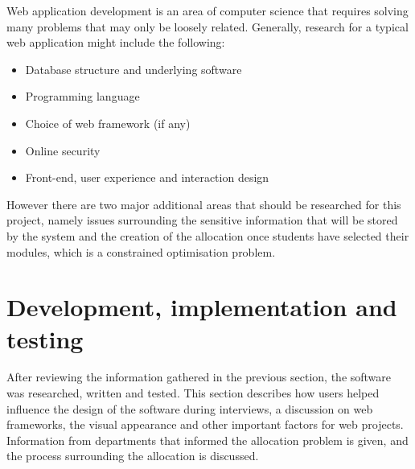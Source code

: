 \documentclass[twoside]{scrartcl}
\let\stdsection\section
\renewcommand\section{\clearpage\stdsection}
\begin{document}

Web application development is an area of computer science that requires
solving many problems that may only be loosely related. Generally, research
for a typical web application might include the following:

\begin{itemize}
  \item Database structure and underlying software
  \item Programming language
  \item Choice of web framework (if any)
  \item Online security
  \item Front-end, user experience and interaction design
\end{itemize}

However there are two major additional areas that should be researched for
this project, namely issues surrounding the sensitive information that will be
stored by the system and the creation of the allocation once students have
selected their modules, which is a constrained optimisation problem.




















\section{Development, implementation and testing}
\label{sec:implementation}


After reviewing the information gathered in the previous section, the software
was researched, written and tested. This section describes how users helped
influence the design of the software during interviews, a discussion on web
frameworks, the visual appearance and other important factors for web
projects. Information from departments that informed the allocation problem is
given, and the process surrounding the allocation is discussed.
\end{document}
